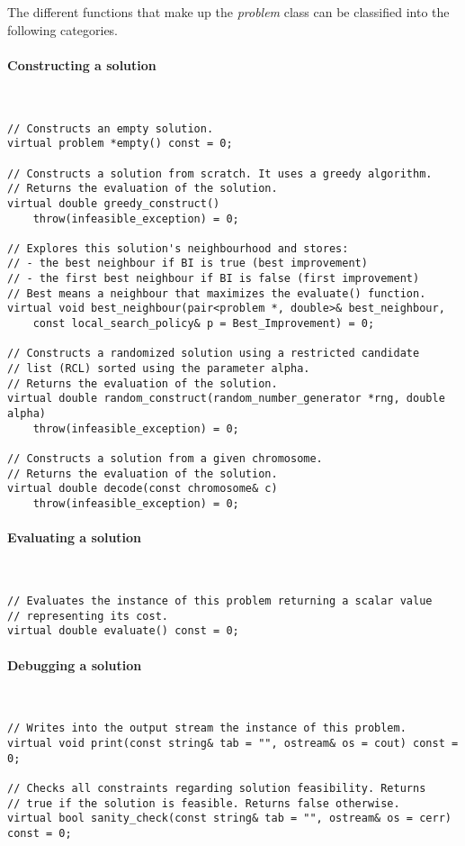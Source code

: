 The different functions that make up the \textit{problem} class can be classified into the
following categories.

\paragraph{Constructing a solution} \ 

\begin{lstlisting}
// Constructs an empty solution.
virtual problem *empty() const = 0;

// Constructs a solution from scratch. It uses a greedy algorithm.
// Returns the evaluation of the solution.
virtual double greedy_construct()
    throw(infeasible_exception) = 0;

// Explores this solution's neighbourhood and stores:
// - the best neighbour if BI is true (best improvement)
// - the first best neighbour if BI is false (first improvement)
// Best means a neighbour that maximizes the evaluate() function.
virtual void best_neighbour(pair<problem *, double>& best_neighbour,
    const local_search_policy& p = Best_Improvement) = 0;

// Constructs a randomized solution using a restricted candidate
// list (RCL) sorted using the parameter alpha.
// Returns the evaluation of the solution.
virtual double random_construct(random_number_generator *rng, double alpha)
    throw(infeasible_exception) = 0;

// Constructs a solution from a given chromosome.
// Returns the evaluation of the solution.
virtual double decode(const chromosome& c)
    throw(infeasible_exception) = 0;
\end{lstlisting}

\paragraph{Evaluating a solution} \

\begin{lstlisting}
// Evaluates the instance of this problem returning a scalar value
// representing its cost.
virtual double evaluate() const = 0;
\end{lstlisting}

\paragraph{Debugging a solution} \

\begin{lstlisting}
// Writes into the output stream the instance of this problem.
virtual void print(const string& tab = "", ostream& os = cout) const = 0;

// Checks all constraints regarding solution feasibility. Returns
// true if the solution is feasible. Returns false otherwise.
virtual bool sanity_check(const string& tab = "", ostream& os = cerr) const = 0;
\end{lstlisting}

